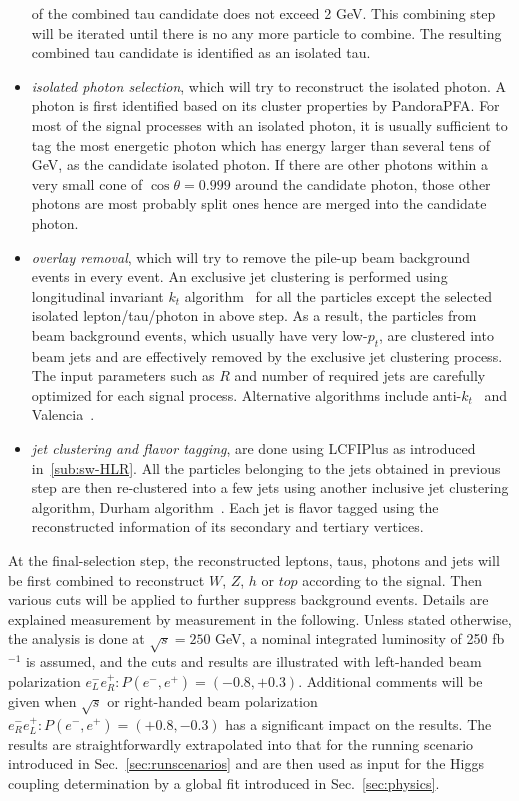 \begin{itemize}
of the combined tau candidate does not exceed 2 GeV. This combining step
will be iterated until there is no any more particle to combine. The resulting 
combined tau candidate is identified as an isolated tau.
\item{\it isolated photon selection}, which will try to reconstruct the isolated photon.
A photon is first identified based on its cluster properties by PandoraPFA. For
most of the signal processes with an isolated photon, it is usually sufficient to tag
the most energetic photon which has energy larger than several tens of GeV, as
the candidate isolated photon. If there are other photons within a very small cone of
$\cos\theta=0.999$ around the candidate photon, those other photons are most
probably split ones hence are merged into the candidate photon.
\item {\it overlay removal}, which will try to remove the pile-up beam background
events in every event. An exclusive jet clustering is performed using 
longitudinal invariant $k_t$ algorithm~\cite{Catani:1993hr}
for all the particles except the selected isolated lepton/tau/photon in above step. 
As a result, the particles from beam background events, which usually have very low-$p_t$, 
are clustered into beam jets and 
are effectively removed by the exclusive jet clustering process. The 
input parameters such as $R$ and number of required jets are carefully optimized 
for each signal process. Alternative algorithms include anti-$k_t$~\cite{Cacciari:2008gp} 
and Valencia~\cite{Boronat:2014hva}.
\item {\it jet clustering and flavor tagging}, are done using LCFIPlus 
as introduced in~\ref{sub:sw-HLR}. 
All the particles belonging to the
jets obtained in previous step are then re-clustered into a few jets using another inclusive 
jet clustering algorithm, Durham algorithm~\cite{Catani:1991hj}.
Each jet is flavor tagged using the reconstructed information of 
its secondary and tertiary vertices. 
\end{itemize}

At the final-selection step, the reconstructed leptons, taus, photons and jets 
will be first combined to reconstruct $W$, $Z$, $h$ or $top$ according to the signal. 
Then various cuts will be applied to further suppress background events.
Details are explained measurement by measurement in the following. 
Unless stated otherwise, the analysis is done at $\sqrt{s}=250$ GeV,
a nominal integrated luminosity of 250 fb$^{-1}$ is assumed, and
the cuts and results are illustrated with left-handed beam polarization
$e^-_Le^+_R: P(e^-,e^+)=(-0.8,+0.3)$. Additional comments will be given
when $\sqrt{s}$ or right-handed beam polarization 
$e^-_Re^+_L: P(e^-,e^+)=(+0.8,-0.3)$ has a significant impact on the results.
The results are straightforwardly extrapolated into that for the running scenario
introduced in Sec.~\ref{sec:runscenarios} and are then used as input for the 
Higgs coupling determination by a global fit introduced in Sec.~\ref{sec:physics}.
